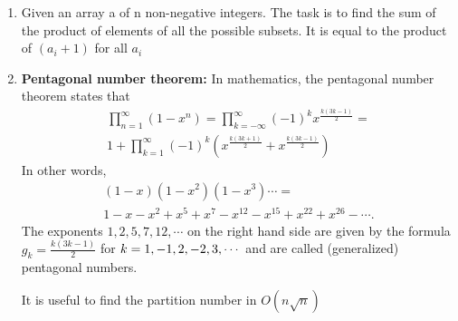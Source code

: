 \begin{enumerate}
    For minimizing
    $$\displaystyle (a_1 - x)^2 + (a_2 - x)^2 +  \ldots  + (a_n - x)^2$$  
    optimal $\displaystyle x = \dfrac{(a_1 + a_2 +  \ldots  + a_n)}{ n}$
\item Given an array a of n non-negative integers. The task is to find the sum of the product of elements of all the possible subsets. It is equal to the product of $\displaystyle (a_i + 1)$ for all $\displaystyle a_i$
\item \textbf{Pentagonal number theorem:}
     In mathematics, the pentagonal number theorem states that
     \begin{multline*}
        \displaystyle \prod_{n = 1}^{\infty}\left ( 1 - x^n \right ) = \prod_{k = -\infty}^{\infty} \left ( -1 \right )^kx^{\frac{k(3k - 1)}{2}} =\\ 1 + \prod_{k = 1}^{\infty}\left (-1\right )^k\left ( x^{\frac{k(3k + 1)}{2}} + x^{\frac{k(3k - 1)}{2}}\right )
     \end{multline*}
     In other words, 
     \begin{multline*}
        \displaystyle (1 - x)(1 - x ^ 2)(1 - x^3)\cdots =\\1 - x - x^2 + x^5 + x^7 - x^{12} - x^{15} + x^{22} + x^{26} - \cdots.
     \end{multline*}
    The exponents $\displaystyle 1, 2, 5, 7, 12,\cdots$ on the right hand side are given by the formula $g_k = \frac{k(3k - 1)}{2}$ for $\displaystyle \displaystyle k = 1, -1, 2, -2, 3, \cdots$ and are called (generalized) pentagonal numbers.  

     It is useful to find the partition number in $O(n \sqrt{n})$
\end{enumerate}


